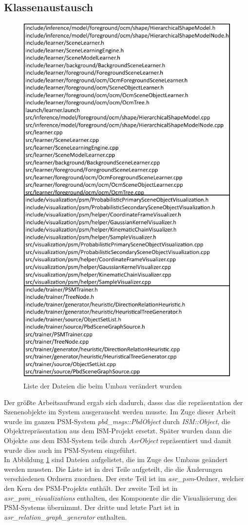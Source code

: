 \subsection{Klassenaustausch}
\begin{figure}
	\centering
	\includegraphics[width=12cm]{bilder/filelist.pdf}
	\caption{Liste der Dateien die beim Umbau verändert wurden}
	\label{img:filelist}
\end{figure}
Der größte Arbeitsaufwand ergab sich dadurch, dasss das die repräsentation der Szenenobjekte im System ausgerauscht werden musste. Im Zuge dieser Arbeit wurde im ganzen PSM-System \textit{pbd\_msgs::PbdObject} durch \textit{ISM::Object}, die Objektrepräsentation aus dem ISM-Projekt ersetzt. Später wurden dann die Objekte aus dem ISM-System teils durch \textit{AsrObject} repräsentiert und damit wurde dies auch im PSM-System eingeführt.\smallskip\\
In Abbildung \ref{img:filelist} sind Dateien aufgelistet, die im Zuge des Umbaus geändert werden mussten. Die Liste ist in drei Teile aufgeteilt, die die Änderungen verschiedenen Ordnern zuordnen. Der erste Teil ist im \textit{asr\_psm}-Ordner, welcher den Kern des PSM-Projekts enthält. Der zweite Teil ist in \textit{asr\_psm\_visualizations} enthalten, des Komponente die die Visualisierung des PSM-Systems übernimmt. Der dritte und letzte Part ist in \textit{asr\_relation\_graph\_generator} enthalten.


